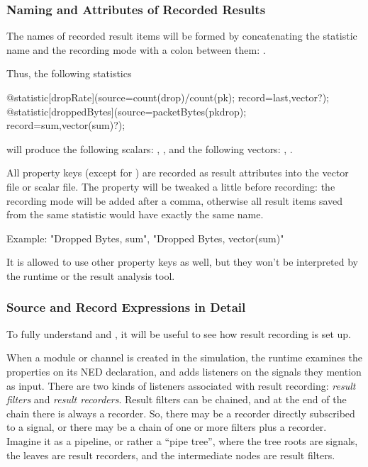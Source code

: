 \subsubsection{Naming and Attributes of Recorded Results}
\label{sec:simple-modules:naming-and-attributes-of-recorded-results}

The names of recorded result items will be formed by concatenating the
statistic name and the recording mode with a colon between them:
.

Thus, the following statistics

\begin{ned}
@statistic[dropRate](source=count(drop)/count(pk); record=last,vector?);
@statistic[droppedBytes](source=packetBytes(pkdrop); record=sum,vector(sum)?);
\end{ned}

will produce the following scalars: , ,
and the following vectors: , .

All property keys (except for ) are recorded as result
attributes into the vector file or scalar file. The  property
will be tweaked a little before recording: the recording mode will be added
after a comma, otherwise all result items saved from the same statistic
would have exactly the same name.

Example: "Dropped Bytes, sum", "Dropped Bytes, vector(sum)"


It is allowed to use other property keys as well, but they won't be
interpreted by the {\opp} runtime or the result analysis tool.


\subsubsection{Source and Record Expressions in Detail}
\label{sec:simple-modules:statistic-source-and-record-details}

To fully understand  and , it will be useful to see
how result recording is set up.

When a module or channel is created in the simulation, the {\opp} runtime
examines the  properties on its NED declaration, and adds
listeners on the signals they mention as input. There are two kinds of
listeners associated with result recording: \textit{result filters} and
\textit{result recorders}. Result filters can be chained, and at the end of
the chain there is always a recorder. So, there may be a recorder directly
subscribed to a signal, or there may be a chain of one or more filters plus
a recorder. Imagine it as a pipeline, or rather a ``pipe tree'', where the
tree roots are signals, the leaves are result recorders, and the
intermediate nodes are result filters.

